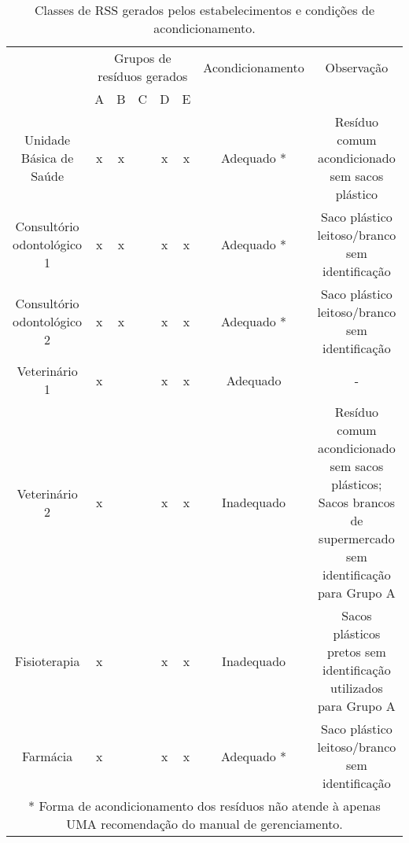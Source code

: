\begin{table}[]
	\centering
	\caption{Classes de RSS gerados pelos estabelecimentos e condições de acondicionamento.}
	\label{tab:classes_rss}
	\begin{tabular}{cccccccc}
		& \multicolumn{5}{c}{Grupos de resíduos gerados} & Acondicionamento & Observação                                                                                                    \\
		& A       & B       & C       & D       & E      &                  &                                                                                                               \\
		Unidade Básica de Saúde    & x       & x       &         & x       & x      & Adequado *       & Resíduo comum acondicionado sem sacos plástico                                                                \\
		Consultório odontológico 1 & x       & x       &         & x       & x      & Adequado *       & Saco plástico leitoso/branco sem identificação                                                                \\
		Consultório odontológico 2 & x       & x       &         & x       & x      & Adequado *       & Saco plástico leitoso/branco sem identificação                                                                \\
		Veterinário 1              & x       &         &         & x       & x      & Adequado         & -                                                                                                             \\
		Veterinário 2              & x       &         &         & x       & x      & Inadequado       & Resíduo comum acondicionado sem sacos plásticos; Sacos brancos de supermercado sem identificação para Grupo A \\
		Fisioterapia               & x       &         &         & x       & x      & Inadequado       & Sacos plásticos pretos sem identificação utilizados para Grupo A                                              \\
		Farmácia                   & x       &         &         & x       & x      & Adequado *       & Saco plástico leitoso/branco sem identificação                                                                \\
		\multicolumn{8}{c}{* Forma de acondicionamento dos resíduos não atende à apenas UMA recomendação do manual de gerenciamento.}                                                                                 
	\end{tabular}
\end{table}